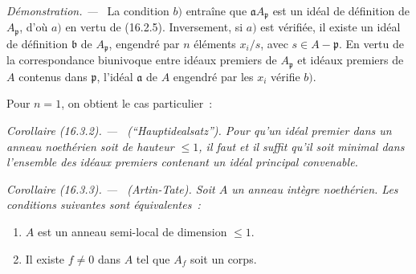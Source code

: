 \documentclass[10pt,oneside]{book}
\makeatletter
\newcommand{\setmanualcurrentlabel}[1]{\def\@currentlabel{#1}}
\newcommand{\oldpage}[2][]{%
  \setcounter{footnote}{0}%
  \marginpar{\scriptsize\textbf{#1}~|~#2}\ignorespaces}
\newenvironment{corollary}[1][]{%
  \setmanualcurrentlabel{#1}\par\medskip\noindent\itshape Corollaire (#1). ---\ }{\par}
\newenvironment{proof}{%
  \par\medskip\noindent\textit{Démonstration. ---\ }}{\par}
\makeatother
\begin{document}
\begin{proof}
La condition $b)$ entraîne que $\mathfrak{a}A_{\mathfrak{p}}$ est un idéal de
définition de $A_{\mathfrak{p}}$, d'où $a)$ en vertu de (16.2.5).
Inversement, si $a)$ est vérifiée, il existe un idéal de définition
$\mathfrak{b}$ de $A_{\mathfrak{p}}$, engendré par $n$ éléments $x_i/s$, avec
$s\in A-\mathfrak{p}$. En vertu de la correspondance biunivoque entre idéaux
premiers de $A_{\mathfrak{p}}$ et idéaux premiers de $A$ contenus dans
$\mathfrak{p}$, l'idéal $\mathfrak{a}$ de $A$ engendré par les $x_i$ vérifie
$b)$.
\end{proof}

\oldpage[0\textsubscript{IV-1}]{29}

Pour $n=1$, on obtient le cas particulier~:

\begin{corollary}[16.3.2]
\label{0.16.3.2-fr}
\textup{(``Hauptidealsatz'').}
Pour qu'un idéal premier dans un anneau noethérien soit de hauteur $\leq1$, il
faut et il suffit qu'il soit minimal dans l'ensemble des idéaux premiers
contenant un idéal principal convenable.
\end{corollary}

\begin{corollary}[16.3.3]
\label{0.16.3.3-fr}
\textup{(Artin-Tate).}
Soit $A$ un anneau intègre noethérien. Les conditions suivantes sont
équivalentes~:
\begin{enumerate}
  \item[$a)$] $A$ est un anneau semi-local de dimension $\leq1$.
  \item[$b)$] Il existe $f\neq0$ dans $A$ tel que $A_f$ soit un corps.
\end{enumerate}
\end{corollary}
\end{document}
